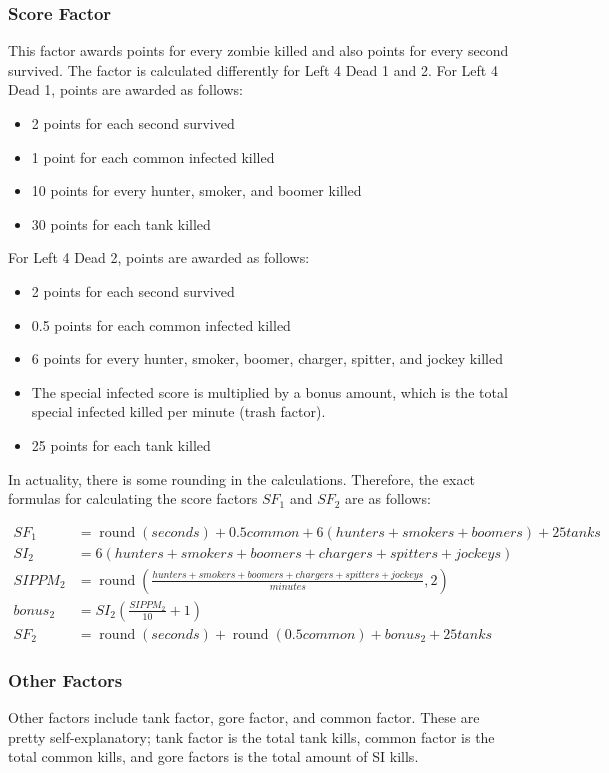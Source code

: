 \subsubsection{Score Factor}
This factor awards points for every zombie killed and also points for every second survived. The factor is calculated differently for Left 4 Dead 1 and 2. For Left 4 Dead 1, points are awarded as follows:
\begin{itemize}
\item 2 points for each second survived
\item 1 point for each common infected killed
\item 10 points for every hunter, smoker, and boomer killed
\item 30 points for each tank killed
\end{itemize}
For Left 4 Dead 2, points are awarded as follows:
\begin{itemize}
\item 2 points for each second survived
\item 0.5 points for each common infected killed
\item 6 points for every hunter, smoker, boomer, charger, spitter, and jockey killed
\item The special infected score is multiplied by a bonus amount, which is the total special infected killed per minute (trash factor).
\item 25 points for each tank killed
\end{itemize}

In actuality, there is some rounding in the calculations. Therefore, the exact formulas for calculating the score factors $SF_{1}$ and $SF_{2}$ are as follows:

\begin{align}
SF_{1} &= \operatorname{round}(seconds) + 0.5common + 6(hunters + smokers + boomers) + 25 tanks \\
SI_{2} &= 6(hunters + smokers + boomers + chargers + spitters + jockeys) \\
SIPPM_{2} &= \operatorname{round}\left(\frac{hunters + smokers + boomers + chargers + spitters + jockeys}{minutes}, 2\right) \\
bonus_{2} &= SI_{2}\left(\frac{SIPPM_{2}}{10} + 1\right) \\
SF_{2} &= \operatorname{round}(seconds) + \operatorname{round}(0.5 common) + bonus_{2} + 25 tanks
\end{align}

\subsubsection{Other Factors}
Other factors include tank factor, gore factor, and common factor. These are pretty self-explanatory; tank factor is the total tank kills, common factor is the total common kills, and gore factors is the total amount of SI kills.

